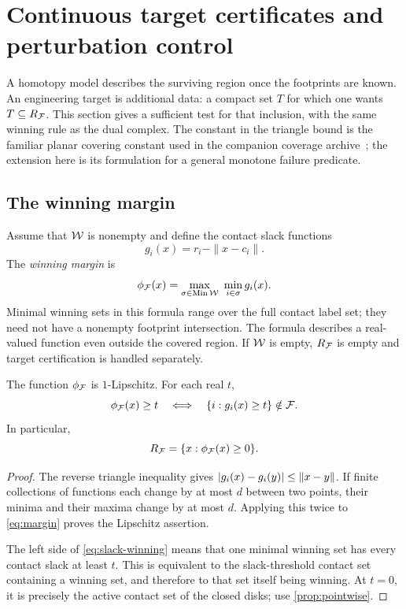 \section{Continuous target certificates and perturbation control}
\label{sec:certificates}
A homotopy model describes the surviving region once the footprints are known. An engineering target is additional data: a compact set $T$ for which one wants $T\subseteq R_{\mathcal F}$. This section gives a sufficient test for that inclusion, with the same winning rule as the dual complex. The constant in the triangle bound is the familiar planar covering constant used in the companion coverage archive~\cite{ecog}; the extension here is its formulation for a general monotone failure predicate.

\subsection{The winning margin}
Assume that $\mathcal W$ is nonempty and define the contact slack functions
\[
g_i(x)=r_i-\|x-c_i\|.
\]
The \emph{winning margin} is
\begin{equation}\label{eq:margin}
\phi_{\mathcal F}(x)=\max_{\sigma\in\operatorname{Min}\mathcal W}\ \min_{i\in\sigma}g_i(x).
\end{equation}
Minimal winning sets in this formula range over the full contact label set; they need not have a nonempty footprint intersection. The formula describes a real-valued function even outside the covered region. If $\mathcal W$ is empty, $R_{\mathcal F}$ is empty and target certification is handled separately.

\begin{lemma}\label{lem:margin}
The function $\phi_{\mathcal F}$ is $1$-Lipschitz. For each real $t$,
\begin{equation}\label{eq:slack-winning}
\phi_{\mathcal F}(x)\ge t\quad\Longleftrightarrow\quad
\{i:g_i(x)\ge t\}\notin\mathcal F.
\end{equation}
In particular,
\begin{equation}\label{eq:margin-region}
R_{\mathcal F}=\{x:\phi_{\mathcal F}(x)\ge0\}.
\end{equation}
\end{lemma}
\begin{proof}
The reverse triangle inequality gives $\left|g_i(x)-g_i(y)\right|\le\|x-y\|$. If finite collections of functions each change by at most $d$ between two points, their minima and their maxima change by at most $d$. Applying this twice to \cref{eq:margin} proves the Lipschitz assertion.

The left side of \cref{eq:slack-winning} means that one minimal winning set has every contact slack at least $t$. This is equivalent to the slack-threshold contact set containing a winning set, and therefore to that set itself being winning. At $t=0$, it is precisely the active contact set of the closed disks; use \cref{prop:pointwise}.
\end{proof}

